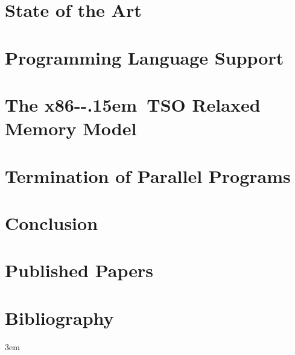 \documentclass[11pt,twoside,a4paper]{book}
\newcommand{\xtso}{\mbox{x86-\kern-.15em TSO}\xspace}
\theoremstyle{mydefstyle}
\begin{document}
\chapter{State of the Art}\label{chap:stateoftheart}


\chapter{Programming Language Support}\label{chap:lang}


\chapter{The \xtso Relaxed Memory Model}\label{chap:mm}


\chapter{Termination of Parallel Programs}\label{chap:lnterm}


\chapter{Conclusion}\label{chap:conclusion}

\appendix

\chapter{Published Papers}\label{chap:published}


\chapter{Bibliography}

{
    \emergencystretch 3em %
    \printbibliography[heading=none]
}
\end{document}
